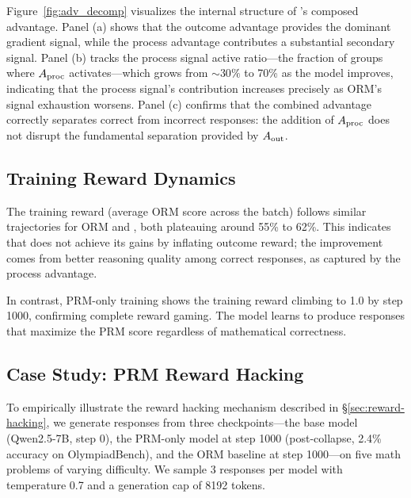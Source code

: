 Figure~\ref{fig:adv_decomp} visualizes the internal structure of \method{}'s composed advantage. Panel (a) shows that the outcome advantage provides the dominant gradient signal, while the process advantage contributes a substantial secondary signal. Panel (b) tracks the process signal active ratio---the fraction of groups where $\aproc$ activates---which grows from ${\sim}30\%$ to 70\% as the model improves, indicating that the process signal's contribution increases precisely as ORM's signal exhaustion worsens. Panel (c) confirms that the combined advantage correctly separates correct from incorrect responses: the addition of $\aproc$ does not disrupt the fundamental separation provided by $\aout$.

\subsection{Training Reward Dynamics}

The training reward (average ORM score across the batch) follows similar trajectories for ORM and \method{}, both plateauing around 55\% to 62\%. This indicates that \method{} does not achieve its gains by inflating outcome reward; the improvement comes from better reasoning quality among correct responses, as captured by the process advantage.

In contrast, PRM-only training shows the training reward climbing to 1.0 by step 1000, confirming complete reward gaming. The model learns to produce responses that maximize the PRM score regardless of mathematical correctness.

\subsection{Case Study: PRM Reward Hacking}
\label{sec:case-study-hacking}

To empirically illustrate the reward hacking mechanism described in \S\ref{sec:reward-hacking}, we generate responses from three checkpoints---the base model (Qwen2.5-7B, step 0), the PRM-only model at step 1000 (post-collapse, 2.4\% accuracy on OlympiadBench), and the ORM baseline at step 1000---on five math problems of varying difficulty. We sample 3 responses per model with temperature 0.7 and a generation cap of 8192 tokens.

